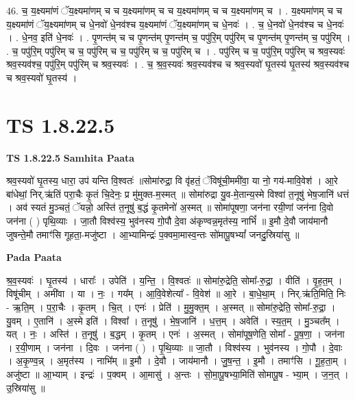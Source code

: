 \documentclass[17pt]{extarticle}
\begin{document}
46. च॒ य॒क्ष्यमा॑णं ॅय॒क्ष्यमा॑णम् च च य॒क्ष्यमा॑णम् च च य॒क्ष्यमा॑णम् च च य॒क्ष्यमा॑णम् च । . य॒क्ष्यमा॑णम् च च य॒क्ष्यमा॑णं ॅय॒क्ष्यमा॑णम् च धे॒नवो॑ धे॒नव॑श्च य॒क्ष्यमा॑णं ॅय॒क्ष्यमा॑णम् च धे॒नवः॑ । . च॒ धे॒नवो॑ धे॒नव॑श्च च धे॒नवः॑ । . धे॒नव॒ इति॑ धे॒नवः॑ । . पृ॒णन्त॑म् च च पृ॒णन्त॑म् पृ॒णन्त॑म् च॒ पपु॑रि॒म् पपु॑रिम् च पृ॒णन्त॑म् पृ॒णन्त॑म् च॒ पपु॑रिम् । . च॒ पपु॑रि॒म् पपु॑रिम् च च॒ पपु॑रिम् च च॒ पपु॑रिम् च च॒ पपु॑रिम् च । . पपु॑रिम् च च॒ पपु॑रि॒म् पपु॑रिम् च श्रव॒स्यवः॑ श्रव॒स्यव॑श्च॒ पपु॑रि॒म् पपु॑रिम् च श्रव॒स्यवः॑ । . च॒ श्र॒व॒स्यवः॑ श्रव॒स्यव॑श्च च श्रव॒स्यवो॑ घृ॒तस्य॑ घृ॒तस्य॑ श्रव॒स्यव॑श्च च श्रव॒स्यवो॑ घृ॒तस्य॑ । \newline
\pagebreak
{}
\section*{ TS 1.8.22.5 }

\textbf{TS 1.8.22.5 } \newline
\textbf{Samhita Paata} \newline

श्रव॒स्यवो॑ घृ॒तस्य॒ धारा॒ उप॑ यन्ति वि॒श्वतः॑ ॥सोमा॑रुद्रा॒ वि वृ॑हतं॒ ॅविषू॑ची॒ममी॑वा॒ या नो॒ गय॑-मावि॒वेश॑ । आ॒रे बा॑धेथां॒ निर्.ऋ॑तिं परा॒चैः कृ॒तं चि॒देनः॒ प्र मु॑मुक्त-म॒स्मत् ॥ सोमा॑रुद्रा यु॒व-मे॒तान्य॒स्मे विश्वा॑ त॒नूषु॑ भेष॒जानि॑ धत्तं । अव॑ स्यतं मु॒ञ्चतं॒ ॅयन्नो॒ अस्ति॑ त॒नूषु॑ ब॒द्धं कृ॒तमेनो॑ अ॒स्मत् ॥ सोमा॑पूषणा॒ जन॑ना रयी॒णां जन॑ना दि॒वो जन॑ना ( ) पृथि॒व्याः । जा॒तौ विश्व॑स्य॒ भुव॑नस्य गो॒पौ दे॒वा अ॑कृण्वन्न॒मृत॑स्य॒ नाभिं᳚ ॥ इ॒मौ दे॒वौ जाय॑मानौ जुषन्ते॒मौ तमाꣳ॑सि गूहता॒-मजु॑ष्टा । आ॒भ्यामिन्द्रः॑ प॒क्वमा॒मास्व॒न्तः सो॑मापू॒षभ्यां᳚ जनदु॒स्रिया॑सु ॥ \newline

\textbf{Pada Paata} \newline

श्र॒व॒स्यवः॑ । घृ॒तस्य॑ । धाराः᳚ । उपेति॑ । य॒न्ति॒ । वि॒श्वतः॑ ॥ सोमा॑रु॒द्रेति॒ सोमा᳚-रु॒द्रा॒ । वीति॑ । वृ॒ह॒त॒म् । विषू॑चीम् । अमी॑वा । या । नः॒ । गय᳚म् । आ॒वि॒वेशेत्या᳚ - वि॒वेश॑ ॥ आ॒रे । बा॒धे॒था॒म् । निर्.ऋ॑ति॒मिति॒ निः - ऋ॒ति॒म् । प॒रा॒चैः । कृ॒तम् । चि॒त् । एनः॑ । प्रेति॑ । मु॒मु॒क्त॒म् । अ॒स्मत् ॥ सोमा॑रु॒द्रेति॒ सोमा᳚-रु॒द्रा॒ । यु॒वम् । ए॒तानि॑ । अ॒स्मे इति॑ । विश्वा᳚ । त॒नूषु॑ । भे॒ष॒जानि॑ । ध॒त्त॒म् । अवेति॑ । स्य॒त॒म् । मु॒ञ्चत᳚म् । यत् । नः॒ । अस्ति॑ । त॒नूषु॑ । ब॒द्धम् । कृ॒तम् । एनः॑ । अ॒स्मत् । सोमा॑पूष॒णेति॒ सोमा᳚ - पू॒ष॒णा॒ । जन॑ना । र॒यी॒णाम् । जन॑ना । दि॒वः । जन॑ना ( ) । पृ॒थि॒व्याः ॥ जा॒तौ । विश्व॑स्य । भुव॑नस्य । गो॒पौ । दे॒वाः । अ॒कृ॒ण्व॒न्न् । अ॒मृत॑स्य । नाभि᳚म् ॥ इ॒मौ । दे॒वौ । जाय॑मानौ । जु॒ष॒न्त॒ । इ॒मौ । तमाꣳ॑सि । गू॒ह॒ता॒म् । अजु॑ष्टा ॥ आ॒भ्याम् । इन्द्रः॑ । प॒क्वम् । आ॒मासु॑ । अ॒न्तः । सो॒मा॒पू॒षभ्या॒मिति॑ सोमापू॒ष - भ्या॒म् । ज॒न॒त् । उ॒स्रिया॑सु ॥  \newline
\end{document}
